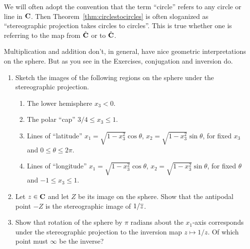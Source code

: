 \documentclass[twocolumn,12pt]{article}
\begin{document}
We will often adopt the convention that the term ``circle'' refers to any circle or line in $\mathbf{C}$. Then Theorem~\ref{thm:circlestocircles} is often sloganized as ``stereographic projection takes circles to circles''. This is true whether one is referring to the map from $\hat{\mathbf{C}}$ or to $\hat{\mathbf{C}}$.

Multiplication and addition don't, in general, have nice geometric interpretations on the sphere. But as you see in the Exercises, conjugation and inversion do.


\begin{exercises}
  \begin{enumerate}
  \item Sketch the images of the following regions on the sphere under the stereographic projection. 
    \begin{enumerate}
      \item The lower hemisphere $x_3 < 0$.
      \item The polar ``cap'' $3/4 \leq x_3 \leq 1$.
      \item Lines of ``latitude'' $x_1 = \sqrt{1 - x_3^2} \cos \theta$, $x_2 = \sqrt{1-x_3^2} \sin \theta$, for fixed $x_3$ and $0 \leq \theta \leq 2\pi$.
      \item Lines of ``longitude'' $x_1 = \sqrt{1 - x_3^2} \cos \theta$, $x_2 = \sqrt{1-x_3^2} \sin \theta$, for fixed $\theta$ and $-1 \leq x_3 \leq 1$.
    \end{enumerate}
    \item Let $z \in \mathbf{C}$ and let $Z$ be its image on the sphere. Show that the antipodal point $-Z$ is the stereographic image of $1/\overline{z}$.
    \item Show that rotation of the sphere by $\pi$ radians about the $x_1$-axis corresponds under the stereographic projection to the inversion map $z \mapsto 1/z$. Of which point must $\infty$ be the inverse?
  \end{enumerate}
\end{exercises}
\end{document}
